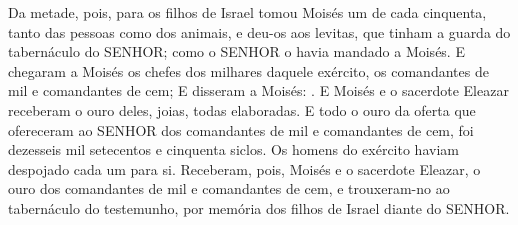 {  Da metade, pois, para os filhos de Israel tomou Moisés um de cada cinquenta, tanto das pessoas como dos animais, e deu-os aos levitas, que tinham a guarda do tabernáculo do SENHOR; como o SENHOR o havia mandado a Moisés.
  E chegaram a Moisés os chefes dos milhares daquele exército, os comandantes de mil e comandantes de cem;
  E disseram a Moisés: .
  E Moisés e o sacerdote Eleazar receberam o ouro deles, joias, todas elaboradas.
  E todo o ouro da oferta que ofereceram ao SENHOR dos comandantes de mil e comandantes de cem, foi dezesseis mil setecentos e cinquenta siclos.
  Os homens do exército haviam despojado cada um para si.
  Receberam, pois, Moisés e o sacerdote Eleazar, o ouro dos comandantes de mil e comandantes de cem, e trouxeram-no ao tabernáculo do testemunho, por memória dos filhos de Israel diante do SENHOR.
\par }

